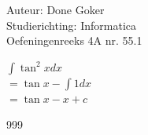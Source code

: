\documentclass[a4paper]{article}
\begin{document}
  
\noindent \large Auteur: Done Goker \\
\noindent \large Studierichting: Informatica\\
\noindent \large Oefeningenreeks 4A nr. 55.1\\

\medskip

\normalsize


$\displaystyle\int \tan^2 x dx$ \\

$= \tan x - \displaystyle\int 1 dx$ \\

$= \tan x - x + c$



\begin{thebibliography}{999}
\end{thebibliography}
\end{document}
